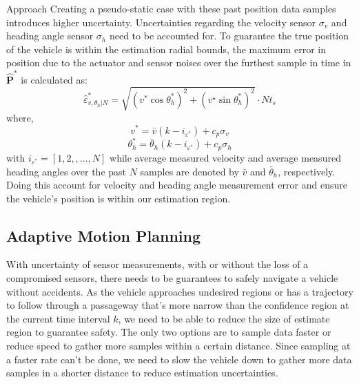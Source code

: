 \begin{section}{Approach}
Creating a pseudo-static case with these past position data samples introduces higher uncertainty. Uncertainties regarding the velocity sensor $\sigma_v$ and heading angle sensor $\sigma_h$ need to be accounted for. To guarantee the true position of the vehicle is within the estimation radial bounds, the maximum error in position due to the actuator and sensor noises over the furthest sample in time in $\hat{\bm{P}}^*$ is calculated as:
    \begin{equation}
	\hat{\varepsilon}_{v,\theta_h|N}^{*}=\sqrt{(v^{*}\cos{\theta_h^{*}})^2+(v^{\star}\sin{\theta_h^{*}})^2} \cdot Nt_s
	\end{equation}
where,
    \begin{equation}
	v^{*}=\bar{v}(k-i_{\varepsilon^{*}})+c_p\sigma_v \nonumber
	\end{equation}
	\begin{equation}
	\theta_h^{*}=\bar{\theta}_h(k-i_{\varepsilon^{*}})+c_p\sigma_h \nonumber
	\end{equation}
with $i_{\varepsilon^{*}}=[1,2,,\dots,N]$ while average measured velocity and average measured heading angles over the past $N$ samples are denoted by $\bar{v}$ and $\bar{\theta}_h$, respectively. Doing this account for velocity and heading angle measurement error and ensure the vehicle's position is within our estimation region.


\subsection{Adaptive Motion Planning}
With uncertainty of sensor measurements, with or without the loss of a compromised sensors, there needs to be guarantees to safely navigate a vehicle without accidents. As the vehicle approaches undesired regions or has a trajectory to follow through a passageway that's more narrow than the confidence region at the current time interval $k$, we need to be able to reduce the size of estimate region to guarantee safety. The only two options are to sample data faster or reduce speed to gather more samples within a certain distance. Since sampling at a faster rate can't be done, we need to slow the vehicle down to gather more data samples in a shorter distance to reduce estimation uncertainties.


\end{section}
